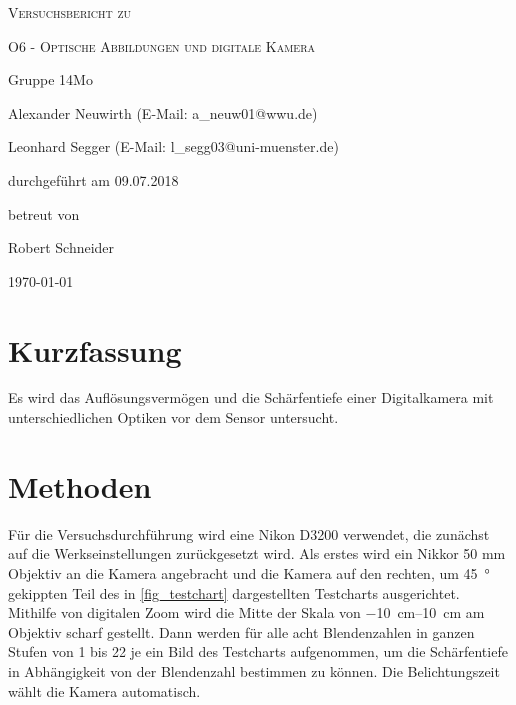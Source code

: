 \documentclass[
	a4paper,
	12pt,
	pagesize,
	ngerman
]{scrartcl}
\begin{document}
	
	\begin{titlepage}
		\centering
		{\scshape\LARGE Versuchsbericht zu \par}
		\vspace{1cm}
		{\scshape\huge O6 - Optische Abbildungen und digitale Kamera \par}
		\vspace{2.5cm}
		{\LARGE Gruppe 14Mo \par}
		\vspace{0.5cm}
		
		{\large Alexander Neuwirth (E-Mail: a\_neuw01@wwu.de) \par}
		{\large Leonhard Segger (E-Mail: l\_segg03@uni-muenster.de) \par}
		\vfill
		
		durchgeführt am 09.07.2018\par
		betreut von\par
		{\large Robert Schneider} 
		
		\vfill
		
		{\large \today\par}
	\end{titlepage}
	\tableofcontents
	\newpage


	\section{Kurzfassung}
	Es wird das Auflösungsvermögen und die Schärfentiefe einer Digitalkamera mit unterschiedlichen Optiken vor dem Sensor untersucht.
	\section{Methoden}
	Für die Versuchsdurchführung wird eine Nikon D3200 verwendet, die zunächst auf die Werkseinstellungen zurückgesetzt wird. %
	Als erstes wird ein Nikkor 50 mm Objektiv an die Kamera angebracht und die Kamera auf den rechten, um \SI{45}{\degree} gekippten Teil des in \cref{fig_testchart} dargestellten Testcharts ausgerichtet.
	Mithilfe von digitalen Zoom wird die Mitte der Skala von \SIrange{-10}{10}{\centi \meter} am Objektiv scharf gestellt.
	Dann werden für alle acht Blendenzahlen in ganzen Stufen von 1 bis 22 je ein Bild des Testcharts aufgenommen, um die Schärfentiefe in Abhängigkeit von der Blendenzahl bestimmen zu können.
	Die Belichtungszeit wählt die Kamera automatisch.
	
\end{document}
